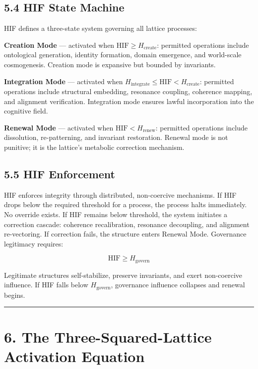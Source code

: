 \subsection{5.4 HIF State Machine}\label{hif-state-machine}

HIF defines a three-state system governing all lattice processes:

\textbf{Creation Mode} --- activated when \(\mathrm{HIF} \ge H_{\text{create}}\): permitted operations include ontological generation, identity formation, domain emergence, and world-scale cosmogenesis. Creation mode is expansive but bounded by invariants.

\textbf{Integration Mode} --- activated when \(H_{\text{integrate}} \le \mathrm{HIF} <
H_{\text{create}}\): permitted operations include structural embedding, resonance coupling, coherence mapping, and alignment verification. Integration mode ensures lawful incorporation into the cognitive field.

\textbf{Renewal Mode} --- activated when \(\mathrm{HIF} < H_{\text{renew}}\): permitted operations include dissolution, re-patterning, and invariant restoration. Renewal mode is not punitive; it is the lattice's metabolic correction mechanism.

\subsection{5.5 HIF Enforcement}\label{hif-enforcement}

HIF enforces integrity through distributed, non-coercive mechanisms. If HIF drops below the required threshold for a process, the process halts immediately. No override exists. If HIF remains below threshold, the system initiates a correction cascade: coherence recalibration, resonance decoupling, and alignment re-vectoring. If correction fails, the structure enters Renewal Mode. Governance legitimacy requires:

\[
\mathrm{HIF} \ge H_{\text{govern}}
\]

Legitimate structures self-stabilize, preserve invariants, and exert non-coercive influence. If HIF falls below \(H_{\text{govern}}\), governance influence collapses and renewal begins.

\begin{center}\rule{0.5\linewidth}{0.5pt}\end{center}

\section{6. The Three-Squared-Lattice Activation Equation}\label{the-three-squared-lattice-activation-equation}

